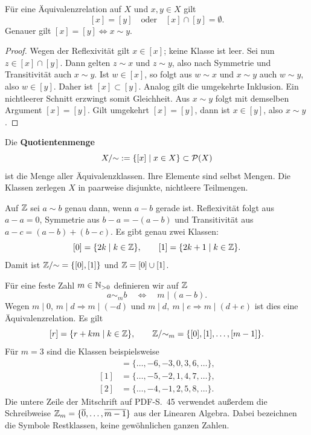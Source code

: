 \begin{lemma}
Für eine Äquivalenzrelation auf $X$ und $x,y\in X$ gilt
\[
    [x]=[y]\quad\text{oder}\quad[x]\cap[y]=\emptyset.
\]
Genauer gilt $[x]=[y]\Longleftrightarrow x\sim y$.
\end{lemma}
\begin{proof}
Wegen der Reflexivität gilt $x\in[x]$; keine Klasse ist leer.
Sei nun $z\in[x]\cap[y]$. Dann gelten $z\sim x$ und $z\sim y$,
also nach Symmetrie und Transitivität auch $x\sim y$.
Ist $w\in[x]$, so folgt aus $w\sim x$ und $x\sim y$ auch $w\sim y$,
also $w\in[y]$. Daher ist $[x]\subset[y]$. Analog gilt die umgekehrte
Inklusion. Ein nichtleerer Schnitt erzwingt somit Gleichheit.
Aus $x\sim y$ folgt mit demselben Argument $[x]=[y]$.
Gilt umgekehrt $[x]=[y]$, dann ist $x\in[y]$, also $x\sim y$.
\end{proof}

\begin{definition}[Quotientenmenge]
Die \textbf{Quotientenmenge}
\[
    X/{\sim}:=\{[x]\mid x\in X\}\subset\mathcal{P}(X)
\]
ist die Menge aller Äquivalenzklassen. Ihre Elemente sind selbst Mengen.
Die Klassen zerlegen $X$ in paarweise disjunkte, nichtleere Teilmengen.
\end{definition}

\begin{beispiel}
Auf $\mathbb{Z}$ sei $a\sim b$ genau dann, wenn $a-b$ gerade ist.
Reflexivität folgt aus $a-a=0$, Symmetrie aus
$b-a=-(a-b)$ und Transitivität aus $a-c=(a-b)+(b-c)$.
Es gibt genau zwei Klassen:
\[
    [0]=\{2k\mid k\in\mathbb{Z}\},\qquad
    [1]=\{2k+1\mid k\in\mathbb{Z}\}.
\]
Damit ist $\mathbb{Z}/{\sim}=\{[0],[1]\}$ und $\mathbb{Z}=[0]\cup[1]$.
\end{beispiel}

\begin{beispiel}
Für eine feste Zahl $m\in\mathbb{N}_{>0}$ definieren wir auf $\mathbb{Z}$
\[
    a\sim_m b\quad\Longleftrightarrow\quad m\mid(a-b).
\]
Wegen $m\mid0$, $m\mid d\Rightarrow m\mid(-d)$ und
$m\mid d,\ m\mid e\Rightarrow m\mid(d+e)$ ist dies eine
Äquivalenzrelation. Es gilt
\[
    [r]=\{r+km\mid k\in\mathbb{Z}\},\qquad
    \mathbb{Z}/{\sim_m}=\{[0],[1],\ldots,[m-1]\}.
\]
Für $m=3$ sind die Klassen beispielsweise
\begin{align*}
    [0]&=\{\ldots,-6,-3,0,3,6,\ldots\},\\
    [1]&=\{\ldots,-5,-2,1,4,7,\ldots\},\\
    [2]&=\{\ldots,-4,-1,2,5,8,\ldots\}.
\end{align*}
Die untere Zeile der Mitschrift auf PDF-S.~45 verwendet außerdem die
Schreibweise $\mathbb{Z}_m=\{\overline0,\ldots,\overline{m-1}\}$ aus der
Linearen Algebra. Dabei bezeichnen die Symbole Restklassen, keine
gewöhnlichen ganzen Zahlen.
\end{beispiel}

